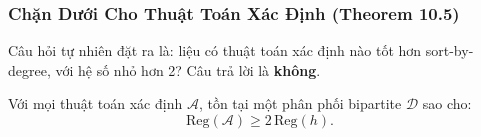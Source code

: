 \subsubsection{Chặn Dưới Cho Thuật Toán Xác Định (Theorem 10.5)}

Câu hỏi tự nhiên đặt ra là: liệu có thuật toán xác định nào tốt hơn sort-by-degree, với hệ số nhỏ hơn 2? Câu trả lời là \textbf{không}.

\begin{theorem}
\label{thm:lower_bound_det}
Với mọi thuật toán xác định $\mathcal{A}$, tồn tại một phân phối bipartite $\mathcal{D}$ sao cho:
\begin{equation}
    \mathrm{Reg}(\mathcal{A}) \geq 2\, \mathrm{Reg}(h).
    \label{eq:lower_bound_det}
\end{equation}
\end{theorem}

